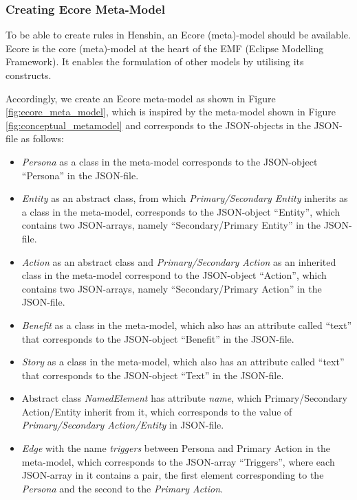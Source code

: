 \subsubsection*{Creating Ecore Meta-Model}\label{workflow_ecore}
To be able to create rules in Henshin, an Ecore (meta)-model should be available. Ecore is the core (meta)-model at the heart of the EMF (Eclipse Modelling Framework). It enables the formulation of other models by utilising its constructs.

Accordingly, we create an Ecore meta-model as shown in Figure \ref{fig:ecore_meta_model}, which is inspired by the meta-model shown in Figure \ref{fig:conceptual_metamodel} and corresponds to the JSON-objects in the JSON-file as follows:
\begin{itemize}
	\item \textit{Persona} as a class in the meta-model corresponds to the JSON-object \enquote{Persona} in the JSON-file.
	\item \textit{Entity} as an abstract class, from which \textit{Primary/Secondary Entity} inherits as a class in the meta-model, corresponds to the JSON-object \enquote{Entity}, which contains two JSON-arrays, namely \enquote{Secondary/Primary Entity} in the JSON-file.
	\item \textit{Action} as an abstract class and \textit{Primary/Secondary Action} as an inherited class in the meta-model correspond to the JSON-object \enquote{Action}, which contains two JSON-arrays, namely \enquote{Secondary/Primary Action} in the JSON-file.
	\item \textit{Benefit} as a class in the meta-model, which also has an attribute called \enquote{text} that corresponds to the JSON-object \enquote{Benefit} in the JSON-file.
	\item \textit{Story} as a class in the meta-model, which also has an attribute called \enquote{text} that corresponds to the JSON-object \enquote{Text} in the JSON-file.
	\item Abstract class \textit{NamedElement} has attribute \textit{name}, which Primary/Secondary Action/Entity inherit from it, which corresponds to the value of \textit{Primary/Secondary Action/Entity} in JSON-file.
	\item \textit{Edge} with the name \textit{triggers} between Persona and Primary Action in the meta-model, which corresponds to the JSON-array \enquote{Triggers}, where each JSON-array in it contains a pair, the first element corresponding to the \textit{Persona} and the second to the \textit{Primary Action}.

\end{itemize}

